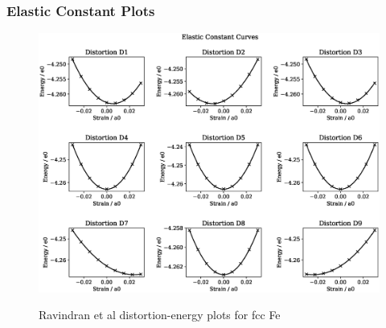 \clearpage
\subsubsection{Elastic Constant Plots}

\begin{figure}[htb]
\centering
\includegraphics[width=.90\linewidth]{chapters/potentials_fe_pd_ru/feru_potential/ec_rfkj/elastic_strains_bp_1.eps}  
\label{fig:feru-fefcc-distortions}
\caption{Ravindran et al\cite{dfttisiravindran} distortion-energy plots for \acrshort{fcc} Fe}
\end{figure}

